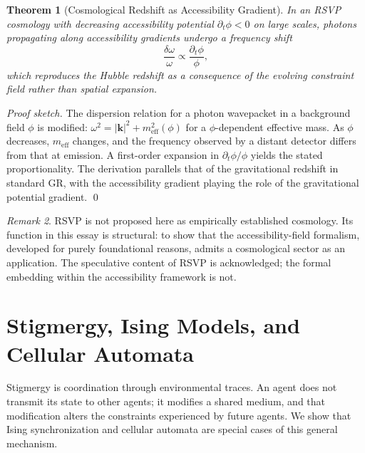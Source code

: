 \documentclass[12pt, a4paper, twoside]{article}
\theoremstyle{plain}
\newtheorem{theorem}{Theorem}[section]
\theoremstyle{definition}
\theoremstyle{remark}
\newtheorem{remark}[theorem]{Remark}
\begin{document}
\begin{theorem}[Cosmological Redshift as Accessibility Gradient]
\label{thm:redshift}
In an RSVP cosmology with decreasing accessibility potential $\partial_t\phi < 0$
on large scales, photons propagating along accessibility gradients undergo a
frequency shift
\[
  \frac{\delta\omega}{\omega} \propto \frac{\partial_t\phi}{\phi},
\]
which reproduces the Hubble redshift as a consequence of the evolving
constraint field rather than spatial expansion.
\end{theorem}

\begin{proof}[Proof sketch]
The dispersion relation for a photon wavepacket in a background field $\phi$ is
modified: $\omega^2 = |\mathbf{k}|^2 + m_\mathrm{eff}^2(\phi)$ for a
$\phi$-dependent effective mass. As $\phi$ decreases, $m_\mathrm{eff}$ changes,
and the frequency observed by a distant detector differs from that at emission.
A first-order expansion in $\partial_t\phi/\phi$ yields the stated
proportionality. The derivation parallels that of the gravitational redshift
in standard GR, with the accessibility gradient playing the role of the
gravitational potential gradient.
\qed
\end{proof}

\begin{remark}
RSVP is not proposed here as empirically established cosmology. Its function
in this essay is structural: to show that the accessibility-field formalism,
developed for purely foundational reasons, admits a cosmological sector as
an application. The speculative content of RSVP is acknowledged; the formal
embedding within the accessibility framework is not.
\end{remark}

\section{Stigmergy, Ising Models, and Cellular Automata}
\label{sec:stigmergy}

Stigmergy is coordination through environmental traces. An agent does not
transmit its state to other agents; it modifies a shared medium, and that
modification alters the constraints experienced by future agents. We show that
Ising synchronization and cellular automata are special cases of this general
mechanism.
\end{document}
